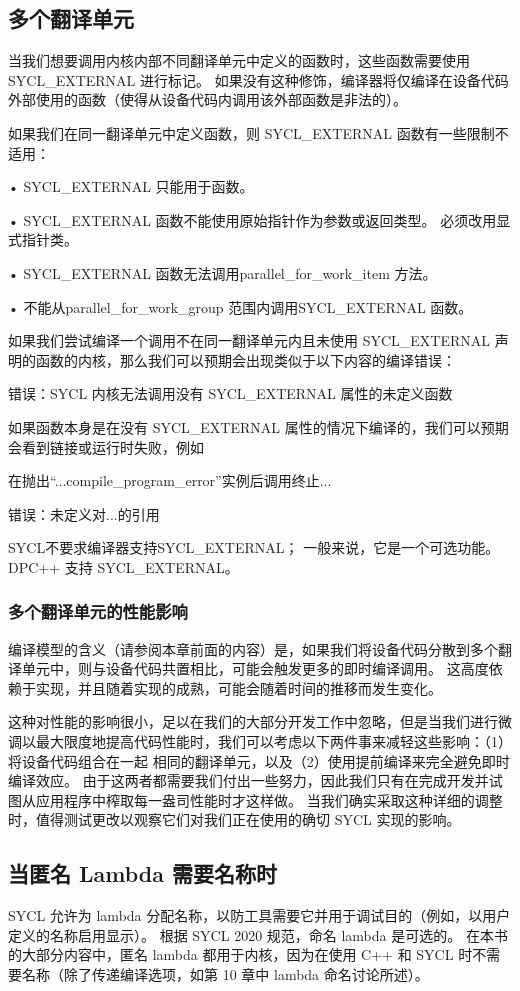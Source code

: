 \subsection{多个翻译单元}
当我们想要调用内核内部不同翻译单元中定义的函数时，这些函数需要使用 SYCL\_EXTERNAL 进行标记。 如果没有这种修饰，编译器将仅编译在设备代码外部使用的函数（使得从设备代码内调用该外部函数是非法的）。

如果我们在同一翻译单元中定义函数，则 SYCL\_EXTERNAL 函数有一些限制不适用：

• SYCL\_EXTERNAL 只能用于函数。

• SYCL\_EXTERNAL 函数不能使用原始指针作为参数或返回类型。 必须改用显式指针类。

• SYCL\_EXTERNAL 函数无法调用parallel\_for\_work\_item 方法。

• 不能从parallel\_for\_work\_group 范围内调用SYCL\_EXTERNAL 函数。

如果我们尝试编译一个调用不在同一翻译单元内且未使用 SYCL\_EXTERNAL 声明的函数的内核，那么我们可以预期会出现类似于以下内容的编译错误：

错误：SYCL 内核无法调用没有 SYCL\_EXTERNAL 属性的未定义函数

如果函数本身是在没有 SYCL\_EXTERNAL 属性的情况下编译的，我们可以预期会看到链接或运行时失败，例如

在抛出“...compile\_program\_error”实例后调用终止...

错误：未定义对...的引用

SYCL不要求编译器支持SYCL\_EXTERNAL； 一般来说，它是一个可选功能。 DPC++ 支持 SYCL\_EXTERNAL。

\subsubsection{多个翻译单元的性能影响}
编译模型的含义（请参阅本章前面的内容）是，如果我们将设备代码分散到多个翻译单元中，则与设备代码共置相比，可能会触发更多的即时编译调用。 这高度依赖于实现，并且随着实现的成熟，可能会随着时间的推移而发生变化。

这种对性能的影响很小，足以在我们的大部分开发工作中忽略，但是当我们进行微调以最大限度地提高代码性能时，我们可以考虑以下两件事来减轻这些影响：（1）将设备代码组合在一起 相同的翻译单元，以及（2）使用提前编译来完全避免即时编译效应。 由于这两者都需要我们付出一些努力，因此我们只有在完成开发并试图从应用程序中榨取每一盎司性能时才这样做。 当我们确实采取这种详细的调整时，值得测试更改以观察它们对我们正在使用的确切 SYCL 实现的影响。

\subsection{当匿名 Lambda 需要名称时}
SYCL 允许为 lambda 分配名称，以防工具需要它并用于调试目的（例如，以用户定义的名称启用显示）。 根据 SYCL 2020 规范，命名 lambda 是可选的。 在本书的大部分内容中，匿名 lambda 都用于内核，因为在使用 C++ 和 SYCL 时不需要名称（除了传递编译选项，如第 10 章中 lambda 命名讨论所述）。

